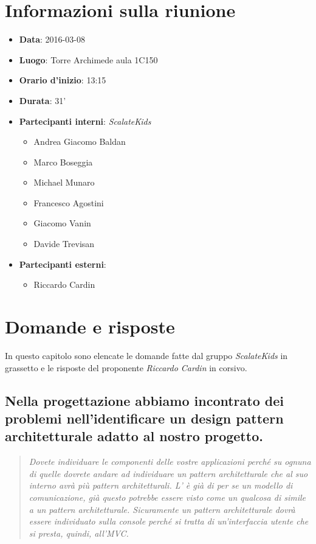 \documentclass{scalatekids-article}
\begin{document}
\section{Informazioni sulla riunione}
\begin{itemize}
\item \textbf{Data}: 2016-03-08
\item \textbf{Luogo}: Torre Archimede aula 1C150
\item \textbf{Orario d'inizio}: 13:15
\item \textbf{Durata}: 31'
\item \textbf{Partecipanti interni}: \textit{ScalateKids}
  \begin{itemize}
  \item Andrea Giacomo Baldan 
  \item Marco Boseggia
  \item Michael Munaro
  \item Francesco Agostini
  \item Giacomo Vanin
  \item Davide Trevisan
  \end{itemize}
\item \textbf{Partecipanti esterni}:
  \begin{itemize}
  \item Riccardo Cardin
  \end{itemize}
\end{itemize}
\section{Domande e risposte}
In questo capitolo sono elencate le domande fatte dal gruppo \textit{ScalateKids} in grassetto e le risposte del proponente \textit{Riccardo Cardin} in corsivo.
\subsection{Nella progettazione abbiamo incontrato dei problemi nell'identificare un design pattern architetturale adatto al nostro progetto. }
\begin{quote}
  \textit{Dovete individuare le componenti delle vostre applicazioni perché su ognuna di quelle dovrete andare ad individuare un pattern architetturale che al suo interno avrà più pattern architetturali.
  L' è già di per se un modello di comunicazione, già questo potrebbe essere visto come un qualcosa di simile a un pattern architetturale. Sicuramente un pattern architetturale dovrà essere 
  individuato sulla console perché si tratta di un'interfaccia utente che si presta, quindi, all'MVC.\\}
\end{quote}
\end{document}
